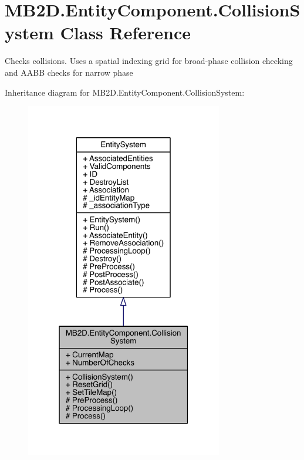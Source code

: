 \hypertarget{class_m_b2_d_1_1_entity_component_1_1_collision_system}{}\section{M\+B2\+D.\+Entity\+Component.\+Collision\+System Class Reference}
\label{class_m_b2_d_1_1_entity_component_1_1_collision_system}


Checks collisions. Uses a spatial indexing grid for broad-\/phase collision checking and A\+A\+BB checks for narrow phase  




Inheritance diagram for M\+B2\+D.\+Entity\+Component.\+Collision\+System\+:\nopagebreak
\begin{figure}[H]
\begin{center}
\leavevmode
\includegraphics[width=244pt]{class_m_b2_d_1_1_entity_component_1_1_collision_system__inherit__graph}
\end{center}
\end{figure}


